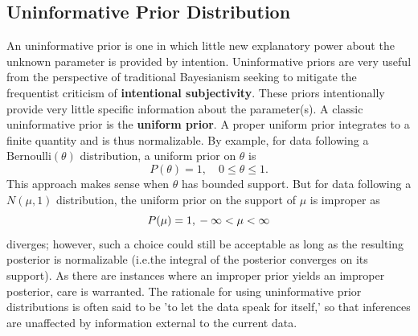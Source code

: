 \subsection{Uninformative Prior Distribution}
 An uninformative prior is one in which little new explanatory power about the unknown parameter is provided by intention. Uninformative priors are very useful from the perspective of traditional Bayesianism seeking  to mitigate the frequentist criticism of \textbf{intentional subjectivity}. These priors intentionally provide very little specific information about the parameter(s).  \newl A classic uninformative prior is the \textbf{uniform prior}. A proper uniform prior integrates to a finite quantity and is thus normalizable. By example, for data following a $\text{Bernoulli}(\theta)$ distribution, a uniform prior on $\theta$ is $$ P(\theta) = 1,\quad  0\leq\theta\leq 1.$$  This approach makes sense when $\theta$ has bounded support.  But for data following a $N(\mu,1)$ distribution, the uniform prior on the support of $\mu$ is improper as  $$P(\mu)=1, \it{} -\infty<\mu<\infty$$ diverges; however, such a choice could still be acceptable as long as the resulting posterior is normalizable (i.e.\@ the integral of the posterior converges on its support). As there are instances where an improper prior yields an improper posterior, care is warranted.  The rationale for using uninformative prior distributions is often said to be 'to let the data speak for itself,' so that inferences are unaffected by information external to the current data.
